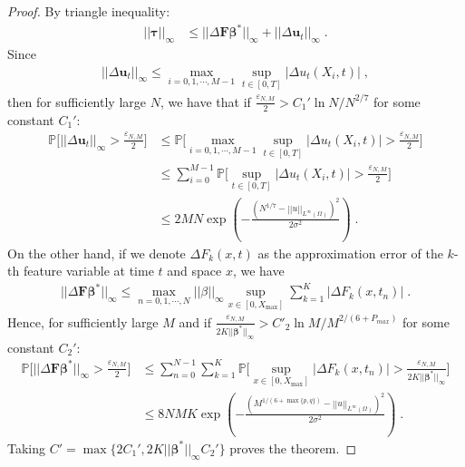 \documentclass[a4paper,11pt]{article}
\newcommand{\btau}{\bm{\tau}}
\newcommand{\bbeta}{\bm{\beta}}
\newcommand{\bF}{\mathbf{F}}
\newcommand{\bu}{\mathbf{u}}
\theoremstyle{definition}
\begin{document}
\begin{proof}
By triangle inequality:
\begin{align*}
||\btau||_\infty&\leq ||\Delta \bF\bbeta^*||_\infty+||\Delta \bu_t||_\infty\;.
\end{align*}
Since
\begin{align*}
||\Delta \bu_t||_\infty\leq \max_{i=0,1,\cdots,M-1}\sup_{t\in[0,T]}|\Delta u_t(X_i,t)|\;,
\end{align*}
then for sufficiently large $N$, we have that if $\frac{\varepsilon_{N,M}}{2}>C_{1}'\ln N/N^{2/7}$ for some constant $C_1'$:
\begin{align*}
\mathbb{P}\Big[||\Delta \bu_t||_\infty>\frac{\varepsilon_{N,M}}{2}\Big]&\leq\mathbb{P}\Big[\max_{i=0,1,\cdots,M-1}\sup_{t\in[0,T]}|\Delta u_t(X_i,t)|>\frac{\varepsilon_{N,M}}{2}\Big]	\\
&\leq \sum_{i=0}^{M-1}\mathbb{P}\Big[\sup_{t\in[0,T]}|\Delta u_t(X_i,t)|>\frac{\varepsilon_{N,M}}{2}\Big]\\
&\leq 2MN \exp(-\frac{(N^{1/7}-||u||_{L^\infty(\Omega)})^2}{2\sigma^2})\;.
\end{align*}
On the other hand, if we denote $\Delta F_k(x,t)$ as the approximation error of the $k$-th feature variable at time $t$ and space $x$, we have
\begin{align*}
||\Delta \bF\bbeta^*||_\infty\leq \max_{n=0,1,\cdots, N}||\beta||_\infty	\sup_{x\in[0,X_{\max}]}\sum_{k=1}^K|\Delta F_{k}(x,t_n)|\;.
\end{align*}
Hence, for sufficiently large $M$ and if $\frac{\varepsilon_{N,M}}{2K||\bbeta^*||_\infty}>C'_2\ln M/M^{2/(6+P_{max})}$ for some constant $C_2'$:
\begin{align*}
\mathbb{P}\Big[||\Delta \bF\bbeta^*||_\infty>\frac{\varepsilon_{N,M}}{2}\Big]&\leq \sum_{n=0}^{N-1}\sum_{k=1}^{K}\mathbb{P}\Big[\sup_{x\in[0,X_{\max}]}|\Delta F_{k}(x,t_n)|>\frac{\varepsilon_{N,M}}{2K||\bbeta^*||_\infty}\Big]\\
&\leq 8NMK \exp(-\frac{(M^{1/(6+\max\{p,q\})}-||u||_{L^\infty(\Omega)})^2}{2\sigma^2})\;.
\end{align*}
Taking $C'=\max\{2C_1',2K||\bbeta^*||_\infty C_2'\}$   proves the theorem.
\end{proof}
\end{document}
